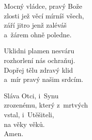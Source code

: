 \begin{translatioMulticol}{3}
Mocný vládce, pravý Bože\\
zlosti jež věcí mírníš všech,\\
září jitro jenž zaléváš\\
a~žárem ohně poledne.\columnbreak

Uklidni plamen nesváru\\
rozhorlení nás ochraňuj.\\
Dopřej tělu zdravý klid\\
a~mír pravý našim srdcím.\columnbreak

Sláva Otci, i~Synu\\
zrozenému, který z~mrtvých\\
vstal, i~Utěšiteli,\\
na věky věků.\\
Amen.
\end{translatioMulticol}
